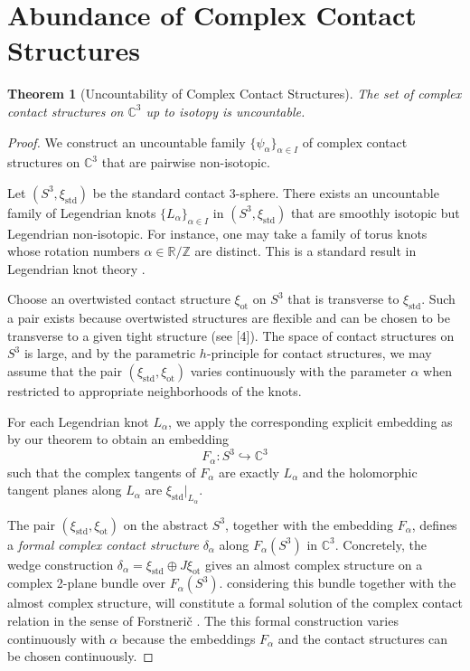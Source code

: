 \documentclass{amsart}
\newtheorem{theorem}{Theorem}
\begin{document}
\section{Abundance of Complex Contact Structures}
\begin{theorem}[Uncountability of Complex Contact Structures]
The set of complex contact structures on $\mathbb{C}^3$ up to isotopy is uncountable.
\end{theorem}

\begin{proof}
We construct an uncountable family $\{\psi_\alpha\}_{\alpha\in I}$ of complex contact structures on $\mathbb{C}^3$ that are pairwise non-isotopic.

\medskip
Let $(S^3,\xi_{\mathrm{std}})$ be the standard contact 3-sphere. 
There exists an uncountable family of Legendrian knots $\{L_\alpha\}_{\alpha\in I}$ in $(S^3,\xi_{\mathrm{std}})$ 
that are smoothly isotopic but Legendrian non-isotopic. 
For instance, one may take a family of torus knots whose rotation numbers $\alpha\in\mathbb{R}/\mathbb{Z}$ 
are distinct. This is a standard result in Legendrian knot theory \cite{EtnyreHonda2001}.

\medskip
Choose an overtwisted contact structure $\xi_{\mathrm{ot}}$ on $S^3$ that is transverse to $\xi_{\mathrm{std}}$. 
Such a pair exists because overtwisted structures are flexible and can be chosen to be transverse to a given tight structure (see [4]). 
The space of contact structures on $S^3$ is large, and by the parametric $h$-principle for contact structures, 
we may assume that the pair $(\xi_{\mathrm{std}},\xi_{\mathrm{ot}})$ varies continuously with the parameter $\alpha$ 
when restricted to appropriate neighborhoods of the knots.

\medskip
For each Legendrian knot $L_\alpha$, we apply the corresponding explicit embedding as by our theorem \cite{Elgindi2025} to obtain an embedding
\[
F_\alpha: S^3 \hookrightarrow \mathbb{C}^3
\]
such that the complex tangents of $F_\alpha$ are exactly $L_\alpha$ and the holomorphic tangent planes along $L_\alpha$ 
are $\xi_{\mathrm{std}}|_{L_\alpha}$.

The pair $(\xi_{\mathrm{std}},\xi_{\mathrm{ot}})$ on the abstract $S^3$, together with the embedding $F_\alpha$, 
defines a \emph{formal complex contact structure} $\delta_\alpha$ along $F_\alpha(S^3)$ in $\mathbb{C}^3$. 
Concretely, the wedge construction $\delta_\alpha = \xi_{\mathrm{std}} \oplus J\xi_{\mathrm{ot}}$ gives an almost complex structure 
on a complex 2-plane bundle over $F_\alpha(S^3)$. considering this bundle together with the almost complex structure, will
constitute a formal solution of the complex contact relation in the sense of Forstnerič \cite{Forstneric2020}. 
The this formal construction varies continuously with $\alpha$ because the embeddings $F_\alpha$ and the contact structures can be chosen continuously.


\end{proof}
\end{document}
